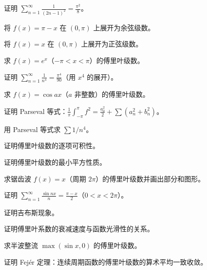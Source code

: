 \begin{exercise}[3] 证明 \(\sum_{n=1}^\infty \frac{1}{(2n-1)^2} = \frac{\pi^2}{8}\)。\end{exercise}
\begin{exercise}[3] 将 \(f(x)=\pi-x\) 在 \((0,\pi)\) 上展开为余弦级数。\end{exercise}
\begin{exercise}[3] 将 \(f(x)=x\) 在 \((0,\pi)\) 上展开为正弦级数。\end{exercise}
\begin{exercise}[4] 求 \(f(x)=e^x\)（\(-\pi<x<\pi\)）的傅里叶级数。\end{exercise}
\begin{exercise}[4] 证明 \(\sum_{n=1}^\infty \frac{1}{n^4} = \frac{\pi^4}{90}\)（用 \(x^4\) 的展开）。\end{exercise}
\begin{exercise}[4] 求 \(f(x)=\cos ax\)（\(a\) 非整数）的傅里叶级数。\end{exercise}
\begin{exercise}[4] 证明 Parseval 等式：\(\frac1\pi\int_{-\pi}^\pi f^2 = \frac{a_0^2}{2}+\sum(a_n^2+b_n^2)\)。\end{exercise}
\begin{exercise}[4] 用 Parseval 等式求 \(\sum 1/n^4\)。\end{exercise}
\begin{exercise}[5] 证明傅里叶级数的逐项可积性。\end{exercise}
\begin{exercise}[5] 证明傅里叶级数的最小平方性质。\end{exercise}
\begin{exercise}[5] 求锯齿波 \(f(x)=x\)（周期 \(2\pi\)）的傅里叶级数并画出部分和图形。\end{exercise}
\begin{exercise}[5] 证明 \(\sum_{n=1}^\infty \frac{\sin nx}{n} = \frac{\pi-x}{2}\)（\(0<x<2\pi\)）。\end{exercise}
\begin{exercise}[6] 证明吉布斯现象。\end{exercise}
\begin{exercise}[6] 证明傅里叶系数的衰减速度与函数光滑性的关系。\end{exercise}
\begin{exercise}[6] 求半波整流 \(\max(\sin x,0)\) 的傅里叶级数。\end{exercise}
\begin{exercise}[7] 证明 Fej\'er 定理：连续周期函数的傅里叶级数的算术平均一致收敛。\end{exercise}
